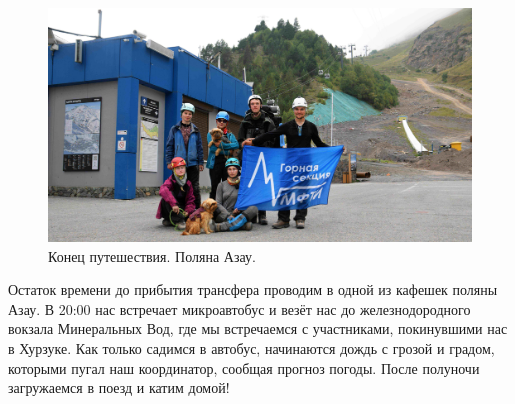 \begin{figure}[h!]
	\centering
	\includegraphics[width=0.7\linewidth]{../pics/group_finish.jpg}
	\caption{Конец путешествия. Поляна Азау.}
	\label{fig:group_finish}
\end{figure}

Остаток времени до прибытия трансфера проводим в одной из кафешек поляны Азау.
В 20:00 нас встречает микроавтобус и везёт нас до железнодородного вокзала Минеральных Вод, где мы встречаемся с участниками, покинувшими нас в Хурзуке. Как только садимся в автобус, начинаются дождь с грозой и градом, которыми пугал наш координатор, сообщая прогноз погоды. После полуночи загружаемся в поезд и катим домой!

\clearpage